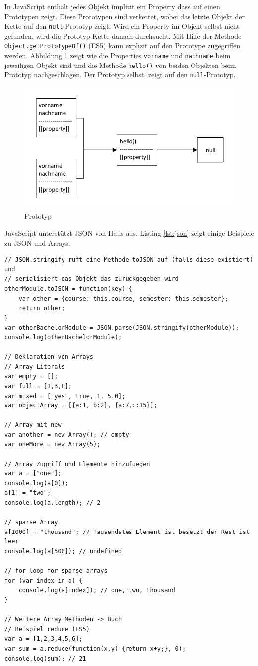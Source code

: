 In JavaScript enthält jedes Objekt implizit ein Property dass auf einen Prototypen zeigt. Diese Prototypen sind verkettet, wobei das letzte Objekt der Kette auf den \lstinline|null|-Prototyp zeigt. Wird ein Property im Objekt selbst nicht gefunden, wird die Prototyp-Kette danach durchsucht. Mit Hilfe der Methode \lstinline|Object.getPrototypeOf()| (ES5) kann explizit auf den Prototype zugegriffen werden. Abbildung \ref{fig:prototyp} zeigt wie die Properties \lstinline|vorname| und \lstinline|nachname| beim jeweiligen Objekt sind und die Methode \lstinline|hello()| von beiden Objekten beim Prototyp nachgeschlagen. Der Prototyp selbst, zeigt auf den \lstinline|null|-Prototyp.

\begin{figure}
\centering
\includegraphics[width=0.7\linewidth]{fig/prototyp}
\caption{Prototyp}
\label{fig:prototyp}
\end{figure}

JavaScript unterstützt JSON von Haus aus. Listing \ref{lst:json} zeigt einige Beispiele zu JSON und Arrays.

\begin{lstlisting}[label=lst:json,caption=JSON]
// JSON.stringify ruft eine Methode toJSON auf (falls diese existiert) und 
// serialisiert das Objekt das zurückgegeben wird
otherModule.toJSON = function(key) {
	var other = {course: this.course, semester: this.semester};
	return other;
}
var otherBachelorModule = JSON.parse(JSON.stringify(otherModule));
console.log(otherBachelorModule);

// Deklaration von Arrays
// Array Literals
var empty = [];
var full = [1,3,8];
var mixed = ["yes", true, 1, 5.0];
var objectArray = [{a:1, b:2}, {a:7,c:15}];

// Array mit new
var another = new Array(); // empty
var oneMore = new Array(5);

// Array Zugriff und Elemente hinzufuegen
var a = ["one"];
console.log(a[0]);
a[1] = "two";
console.log(a.length); // 2

// sparse Array
a[1000] = "thousand"; // Tausendstes Element ist besetzt der Rest ist leer
console.log(a[500]); // undefined

// for loop for sparse arrays
for (var index in a) {
	console.log(a[index]); // one, two, thousand
}

// Weitere Array Methoden -> Buch
// Beispiel reduce (ES5)
var a = [1,2,3,4,5,6];
var sum = a.reduce(function(x,y) {return x+y;}, 0);
console.log(sum); // 21
\end{lstlisting}

